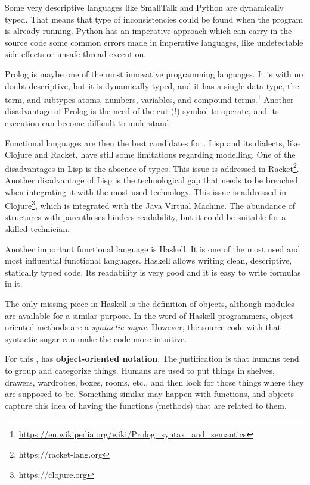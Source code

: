 Some very descriptive languages like SmallTalk and Python are dynamically typed.
That means that type of inconsistencies could be found when the program is already running.
Python has an imperative approach which can carry in the source code some common errors made in imperative languages, like undetectable side effects or unsafe thread execution.

Prolog is maybe one of the most innovative programming languages.
It is with no doubt descriptive, but it is dynamically typed, and it has a single data type, the term, and subtypes atoms, numbers, variables, and compound terms.\footnote{\url{https://en.wikipedia.org/wiki/Prolog_syntax_and_semantics}}
Another disadvantage of Prolog is the need of the cut (!) symbol to operate, and its execution can become difficult to understand.

Functional languages are then the best candidates for \Soda.
Lisp and its dialects, like Clojure and Racket, have still some limitations regarding modelling.
One of the disadvantages in Lisp is the absence of types.
This issue is addressed in Racket\footnote{https://racket-lang.org}.
Another disadvantage of Lisp is the technological gap that needs to be breached when integrating it with the most used technology.
This issue is addressed in Clojure\footnote{https://clojure.org}, which is integrated with the Java Virtual Machine.
The abundance of structures with parentheses hinders readability, but it could be suitable for a skilled technician.

Another important functional language is Haskell.
It is one of the most used and most influential functional languages.
Haskell allows writing clean, descriptive, statically typed code.
Its readability is very good and it is easy to write formulas in it.

The only missing piece in Haskell is the definition of objects, although modules are available for a similar purpose.
In the word of Haskell programmers, object-oriented methods are a \textit{syntactic sugar}.
However, the source code with that syntactic sugar can make the code more intuitive.

For this \Soda, has \textbf{object-oriented notation}.
The justification is that humans tend to group and categorize things. %
Humans are used to put things in shelves, drawers, wardrobes, boxes, rooms, etc., and then look for those things where they are supposed to be.
Something similar may happen with functions, and objects capture this idea of having the functions (methods) that are related to them.

